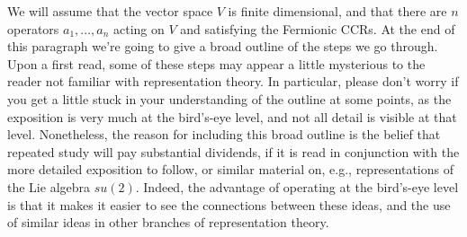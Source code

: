 \documentclass[12pt]{article}
\begin{document}
We will assume that the vector space $V$ is finite dimensional, and
that there are $n$ operators $a_1,\ldots,a_n$ acting on $V$ and
satisfying the Fermionic CCRs.  At the end of this paragraph we're
going to give a broad outline of the steps we go through.  Upon a
first read, some of these steps may appear a little mysterious to the
reader not familiar with representation theory.  In particular, please
don't worry if you get a little stuck in your understanding of the
outline at some points, as the exposition is very much at the
bird's-eye level, and not all detail is visible at that level.
Nonetheless, the reason for including this broad outline is the belief
that repeated study will pay substantial dividends, if it is read in
conjunction with the more detailed exposition to follow, or similar
material on, e.g., representations of the Lie algebra $su(2)$.
Indeed, the advantage of operating at the bird's-eye level is that it
makes it easier to see the connections between these ideas, and the
use of similar ideas in other branches of representation theory.
\end{document}
